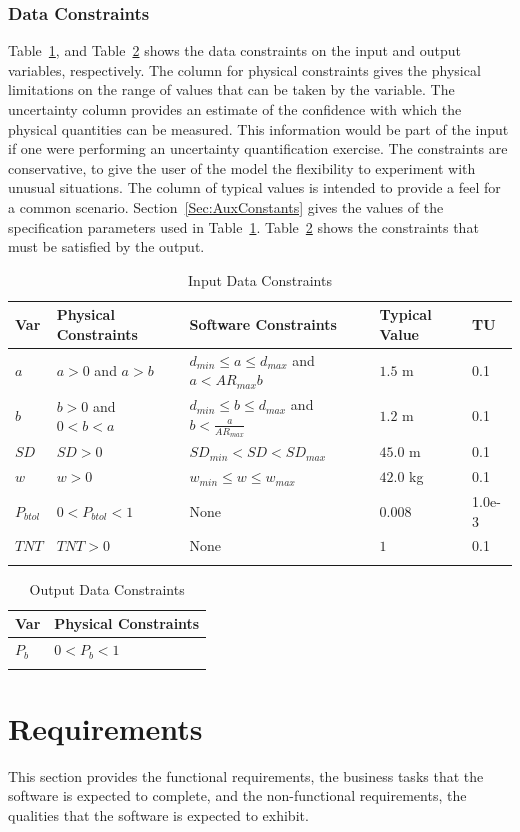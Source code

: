 \documentclass[12pt]{article}
\begin{document}
\subsubsection{Data Constraints}
\label{Sec:DataConstraints}
Table~\ref{Table:InDataConstraints}, and Table~\ref{Table:OutDataConstraints} shows the data constraints on the input and output variables, respectively. The column for physical constraints gives the physical limitations on the range of values that can be taken by the variable. The uncertainty column provides an estimate of the confidence with which the physical quantities can be measured. This information would be part of the input if one were performing an uncertainty quantification exercise. The constraints are conservative, to give the user of the model the flexibility to experiment with unusual situations. The column of typical values is intended to provide a feel for a common scenario. Section~\ref{Sec:AuxConstants} gives the values of the specification parameters used in Table~\ref{Table:InDataConstraints}. Table~\ref{Table:OutDataConstraints} shows the constraints that must be satisfied by the output.
\begin{longtable}{l l l l l}
\toprule
Var & Physical Constraints & Software Constraints & Typical Value & TU
\\
\midrule
$a$ & $a>0$ and $a>b$ & ${d_{min}}\leq{}a\leq{}{d_{max}}$ and $a<{AR_{max}} b$ & $1.5$ m & 0.1
\\
$b$ & $b>0$ and $0<b<a$ & ${d_{min}}\leq{}b\leq{}{d_{max}}$ and $b<\frac{a}{{AR_{max}}}$ & $1.2$ m & 0.1
\\
$SD$ & $SD>0$ & ${SD_{min}}<SD<{SD_{max}}$ & $45.0$ m & 0.1
\\
$w$ & $w>0$ & ${w_{min}}\leq{}w\leq{}{w_{max}}$ & $42.0$ kg & 0.1
\\
${P_{btol}}$ & $0<{P_{btol}}<1$ & None & $0.008$ & 1.0e-3
\\
$TNT$ & $TNT>0$ & None & $1$ & 0.1
\\
\bottomrule
\caption{Input Data Constraints}
\label{Table:InDataConstraints}
\end{longtable}
\begin{longtable}{l l}
\toprule
Var & Physical Constraints
\\
\midrule
${P_{b}}$ & $0<{P_{b}}<1$
\\
\bottomrule
\caption{Output Data Constraints}
\label{Table:OutDataConstraints}
\end{longtable}
\section{Requirements}
\label{Sec:Requirements}
This section provides the functional requirements, the business tasks that the software is expected to complete, and the non-functional requirements, the qualities that the software is expected to exhibit.
\end{document}

